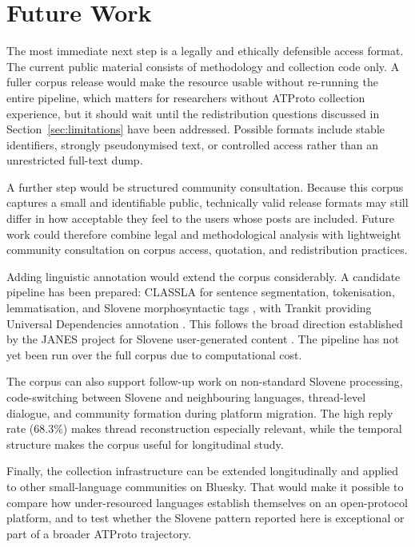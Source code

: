 \section{Future Work}\label{sec:future-work}

The most immediate next step is a legally and ethically defensible access format. The current public material consists of methodology and collection code only. A fuller corpus release would make the resource usable without re-running the entire pipeline, which matters for researchers without ATProto collection experience, but it should wait until the redistribution questions discussed in Section~\ref{sec:limitations} have been addressed. Possible formats include stable identifiers, strongly pseudonymised text, or controlled access rather than an unrestricted full-text dump.

A further step would be structured community consultation. Because this corpus captures a small and identifiable public, technically valid release formats may still differ in how acceptable they feel to the users whose posts are included. Future work could therefore combine legal and methodological analysis with lightweight community consultation on corpus access, quotation, and redistribution practices.

Adding linguistic annotation would extend the corpus considerably. A candidate pipeline has been prepared: CLASSLA for sentence segmentation, tokenisation, lemmatisation, and Slovene morphosyntactic tags \parencite{ljubesic2019neural}, with Trankit providing Universal Dependencies annotation \parencite{nguyen2021trankit}. This follows the broad direction established by the JANES project for Slovene user-generated content \parencite{erjavec2019janes}. The pipeline has not yet been run over the full corpus due to computational cost.

The corpus can also support follow-up work on non-standard Slovene processing, code-switching between Slovene and neighbouring languages, thread-level dialogue, and community formation during platform migration. The high reply rate (68.3\%) makes thread reconstruction especially relevant, while the temporal structure makes the corpus useful for longitudinal study.

Finally, the collection infrastructure can be extended longitudinally and applied to other small-language communities on Bluesky. That would make it possible to compare how under-resourced languages establish themselves on an open-protocol platform, and to test whether the Slovene pattern reported here is exceptional or part of a broader ATProto trajectory.

